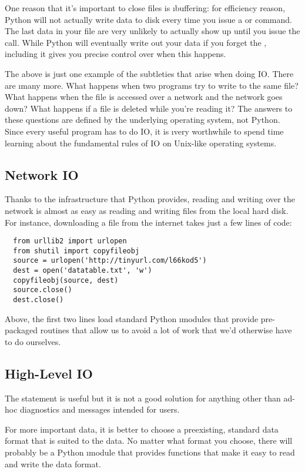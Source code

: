 \documentclass[letterpaper, 12pt, titlepage, twoside]{article}
\begin{document}
One reason that it's important to close files is \i{buffering}: for efficiency
reason, Python will not actually write data to disk every time you issue a
 or  command. The last data in your file are very unlikely
to actually show up until you issue the  call. While Python will
eventually write out your data if you forget the , including it
gives you precise control over when this happens.

The above is just one example of the subtleties that arise when doing IO.
There are \i{many} more. What happens when two programs try to write to the
same file? What happens when the file is accessed over a network and the
network goes down? What happens if a file is deleted while you're reading it?
The answers to these questions are defined by the underlying operating system,
not Python. Since every useful program has to do IO, it is \i{very} worthwhile
to spend time learning about the fundamental rules of IO on Unix-like
operating systems.

\subsection*{Network IO}

Thanks to the infrastructure that Python provides, reading and writing over
the network is almost as easy as reading and writing files from the local hard
disk. For instance, downloading a file from the internet takes just a few
lines of code:

\begin{lstlisting}
  from urllib2 import urlopen
  from shutil import copyfileobj
  source = urlopen('http://tinyurl.com/l66kod5')
  dest = open('datatable.txt', 'w')
  copyfileobj(source, dest)
  source.close()
  dest.close()
\end{lstlisting}

Above, the first two lines load standard Python \i{modules} that provide
pre-packaged routines that allow us to avoid a lot of work that we'd otherwise
have to do ourselves.

\subsection*{High-Level IO}

The  statement is useful but it is not a good solution for anything
other than ad-hoc diagnostics and messages intended for users.

For more important data, it is better to choose a preexisting, standard data
format that is suited to the data. No matter what format you choose, there
will probably be a Python \i{module} that provides functions that make it easy
to read and write the data format.
\end{document}
